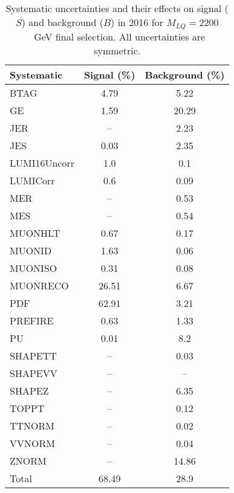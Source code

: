 \begin{table}[htbp]
\begin{center}
\caption{Systematic uncertainties and their effects on signal ($S$) and background ($B$) in 2016 for $M_{LQ}=2200$~GeV final selection. All uncertainties are symmetric.}
\begin{tabular}{lcc}
\hline\hline
Systematic & Signal (\%) & Background (\%) \\ \hline 
BTAG & 4.79 & 5.22\\ 
GE & 1.59 & 20.29\\ 
JER & -- & 2.23\\ 
JES & 0.03 & 2.35\\ 
LUMI16Uncorr & 1.0 & 0.1\\ 
LUMICorr & 0.6 & 0.09\\ 
MER & -- & 0.53\\ 
MES & -- & 0.54\\ 
MUONHLT & 0.67 & 0.17\\ 
MUONID & 1.63 & 0.06\\ 
MUONISO & 0.31 & 0.08\\ 
MUONRECO & 26.51 & 6.67\\ 
PDF & 62.91 & 3.21\\ 
PREFIRE & 0.63 & 1.33\\ 
PU & 0.01 & 8.2\\ 
SHAPETT & -- & 0.03\\ 
SHAPEVV & -- & --\\ 
SHAPEZ & -- & 6.35\\ 
TOPPT & -- & 0.12\\ 
TTNORM & -- & 0.02\\ 
VVNORM & -- & 0.04\\ 
ZNORM & -- & 14.86\\ 
Total & 68.49 & 28.9\\ \hline \hline
\end{tabular}
\label{tab:SysUncertainties_uujj_2200}
\end{center}
\end{table}

